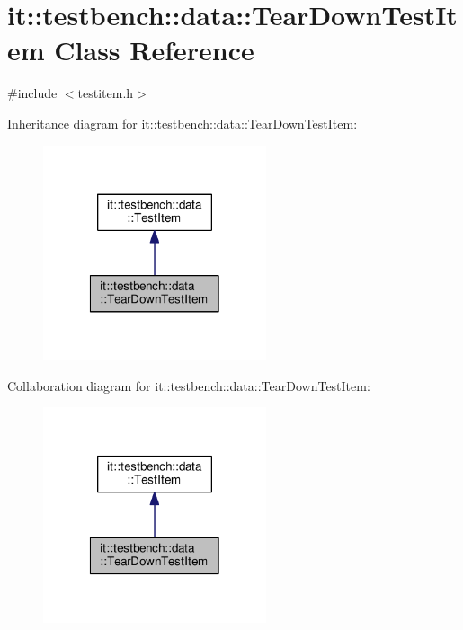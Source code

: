 \hypertarget{classit_1_1testbench_1_1data_1_1TearDownTestItem}{\section{it\-:\-:testbench\-:\-:data\-:\-:Tear\-Down\-Test\-Item Class Reference}
\label{d6/d4b/classit_1_1testbench_1_1data_1_1TearDownTestItem}
}


{\ttfamily \#include $<$testitem.\-h$>$}



Inheritance diagram for it\-:\-:testbench\-:\-:data\-:\-:Tear\-Down\-Test\-Item\-:
\nopagebreak
\begin{figure}[H]
\begin{center}
\leavevmode
\includegraphics[width=186pt]{d5/da6/classit_1_1testbench_1_1data_1_1TearDownTestItem__inherit__graph}
\end{center}
\end{figure}


Collaboration diagram for it\-:\-:testbench\-:\-:data\-:\-:Tear\-Down\-Test\-Item\-:
\nopagebreak
\begin{figure}[H]
\begin{center}
\leavevmode
\includegraphics[width=186pt]{d0/df1/classit_1_1testbench_1_1data_1_1TearDownTestItem__coll__graph}
\end{center}
\end{figure}
